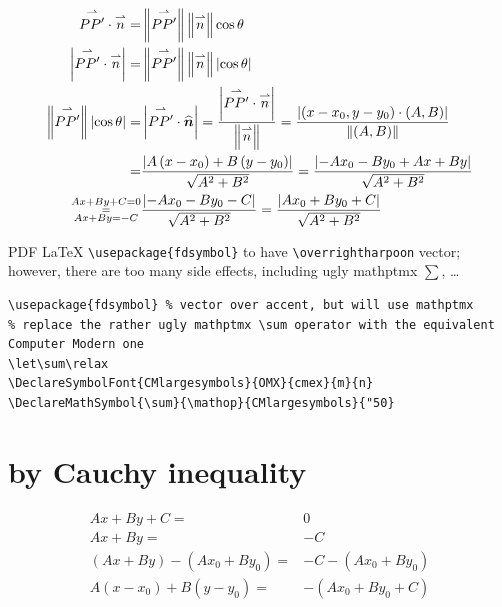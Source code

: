 \documentclass[
]{book}
\theoremstyle{definition}
\theoremstyle{definition}
\theoremstyle{definition}
\theoremstyle{definition}
\theoremstyle{remark}
\begin{document}
\[
\begin{aligned}
\overset{\rightharpoonup}{PP^{\prime}}\cdot\overset{\rightharpoonup}{n}= & \left\Vert \overset{\rightharpoonup}{PP^{\prime}}\right\Vert \left\Vert \overset{\rightharpoonup}{n}\right\Vert \cos\theta\\
\left|\overset{\rightharpoonup}{PP^{\prime}}\cdot\overset{\rightharpoonup}{n}\right|= & \left\Vert \overset{\rightharpoonup}{PP^{\prime}}\right\Vert \left\Vert \overset{\rightharpoonup}{n}\right\Vert \left|\cos\theta\right|\\
\left\Vert \overset{\rightharpoonup}{PP^{\prime}}\right\Vert \left|\cos\theta\right|= & \left|\overset{\rightharpoonup}{PP^{\prime}}\cdot\widehat{\boldsymbol{n}}\right|=\dfrac{\left|\overset{\rightharpoonup}{PP^{\prime}}\cdot\overset{\rightharpoonup}{n}\right|}{\left\Vert \overset{\rightharpoonup}{n}\right\Vert }=\dfrac{\left|\left(x-x_{0},y-y_{0}\right)\cdot\left(A,B\right)\right|}{\left\Vert \left(A,B\right)\right\Vert }\\
= & \dfrac{\left|A\left(x-x_{0}\right)+B\left(y-y_{0}\right)\right|}{\sqrt{A^{2}+B^{2}}}=\dfrac{\left|-Ax_{0}-By_{0}+Ax+By\right|}{\sqrt{A^{2}+B^{2}}}\\
\begin{subarray}{c}
Ax+By+C=0\\
=\\
Ax+By=-C
\end{subarray} & \dfrac{\left|-Ax_{0}-By_{0}-C\right|}{\sqrt{A^{2}+B^{2}}}=\dfrac{\left|Ax_{0}+By_{0}+C\right|}{\sqrt{A^{2}+B^{2}}}
\end{aligned}
\]

PDF LaTeX \texttt{\textbackslash{}usepackage\{fdsymbol\}} to have \texttt{\textbackslash{}overrightharpoon} vector; however, there are too many side effects, including ugly mathptmx \(\sum\), \ldots{}

\begin{verbatim}
\usepackage{fdsymbol} % vector over accent, but will use mathptmx
% replace the rather ugly mathptmx \sum operator with the equivalent Computer Modern one
\let\sum\relax
\DeclareSymbolFont{CMlargesymbols}{OMX}{cmex}{m}{n}
\DeclareMathSymbol{\sum}{\mathop}{CMlargesymbols}{"50}
\end{verbatim}

\section{by Cauchy inequality}\label{by-cauchy-inequality}

\[
\begin{aligned}
Ax+By+C= & 0\\
Ax+By= & -C\\
\left(Ax+By\right)-\left(Ax_{0}+By_{0}\right)= & -C-\left(Ax_{0}+By_{0}\right)\\
A\left(x-x_{0}\right)+B\left(y-y_{0}\right)= & -\left(Ax_{0}+By_{0}+C\right)
\end{aligned}
\]
\end{document}
